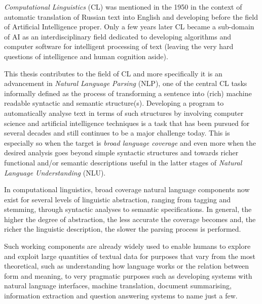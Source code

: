 \textit{Computational Linguistics} (CL) was mentioned in the 1950 in the context of automatic translation \citep{Hutchins1999} of Russian text into English and developing before the field of Artificial Intelligence proper. Only a few years later CL became a sub-domain of AI as an interdisciplinary field dedicated to developing algorithms and computer software for intelligent processing of text (leaving the very hard questions of intelligence and human cognition aside). 

This thesis contributes to the field of CL and more specifically it is an advancement in \textit{Natural Language Parsing} (NLP), one of the central CL tasks informally defined as the process of transforming a sentence into (rich) machine readable syntactic and semantic structure(s). Developing a program to automatically analyse text in terms of such structures by involving computer science and artificial intelligence techniques is a task that has been pursued for several decades and still continues to be a major challenge today. This is especially so when the target is \textit{broad language coverage} and even more when the desired analysis goes beyond simple syntactic structures and towards richer functional and/or semantic descriptions useful in the latter stages of \textit{Natural Language Understanding} (NLU). 

In computational linguistics, broad coverage natural language components now exist for several levels of linguistic abstraction, ranging from tagging and stemming, through syntactic analyses to semantic specifications. In general, the higher the degree of abstraction, the less accurate the coverage becomes and, the richer the linguistic description, the slower the parsing process is performed. 

Such working components are already widely used to enable humans to explore and exploit large quantities of textual data for purposes that vary from the most theoretical, such as understanding how language works or the relation between form and meaning, to very pragmatic purposes such as developing systems with natural language interfaces, machine translation, document summarising, information extraction and question answering systems to name just a few. 


